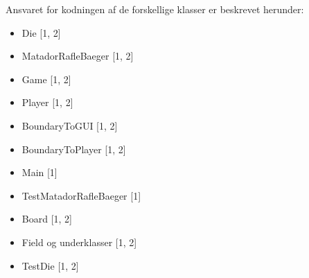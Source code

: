 Ansvaret for kodningen af de forskellige klasser er beskrevet herunder:
\begin{itemize}
\item Die [1, 2]
\item MatadorRafleBaeger [1, 2]
\item Game [1, 2]
\item Player [1, 2]
\item BoundaryToGUI [1, 2]
\item BoundaryToPlayer [1, 2]
\item Main [1]
\item TestMatadorRafleBaeger [1]
\item Board [1, 2]
\item Field og underklasser [1, 2]
\item TestDie [1, 2]
\end{itemize}